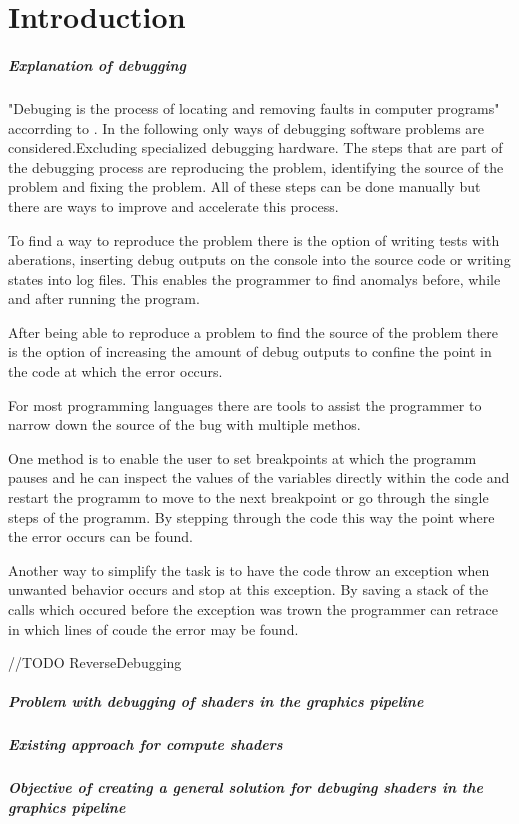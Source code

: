 
\chapter{Introduction}\label{cha:Introduction}

\paragraph{Explanation of debugging}

"Debuging is the process of locating and removing faults in computer programs" accorrding to . In the following only ways of debugging software problems are considered.Excluding specialized debugging hardware. The steps that are part of the debugging process are reproducing the problem, identifying the source of the problem and fixing the problem. All of these steps can be done manually but there are ways to improve and accelerate this process.

To find a way to reproduce the problem there is the option of  writing tests with aberations, inserting debug outputs on the console into the source code or writing states into log files. This enables the programmer to find anomalys before, while and after running the program. 

After being able to reproduce a problem to find the source of the problem there is the option of increasing the amount of debug outputs to confine the point in the code at which the error occurs.

For most programming languages there are tools to assist the programmer to narrow down the source of the bug with multiple methos.

One method is to enable the user to set breakpoints at which the programm pauses and he can inspect the values of the variables directly within the code and restart the programm to move to the next breakpoint or go through the single steps of the programm. By stepping through the code this way the point where the error occurs can be found.

Another way to simplify the task is to have the code throw an exception when unwanted behavior occurs and stop at this exception. By saving a stack of the calls which occured before the exception was trown the programmer can retrace in which lines of coude the error may be found.

//TODO ReverseDebugging

\paragraph{Problem with debugging of shaders in the graphics pipeline}

\paragraph{Existing approach for compute shaders}

\paragraph{Objective of creating a general solution for debuging shaders in the graphics pipeline}